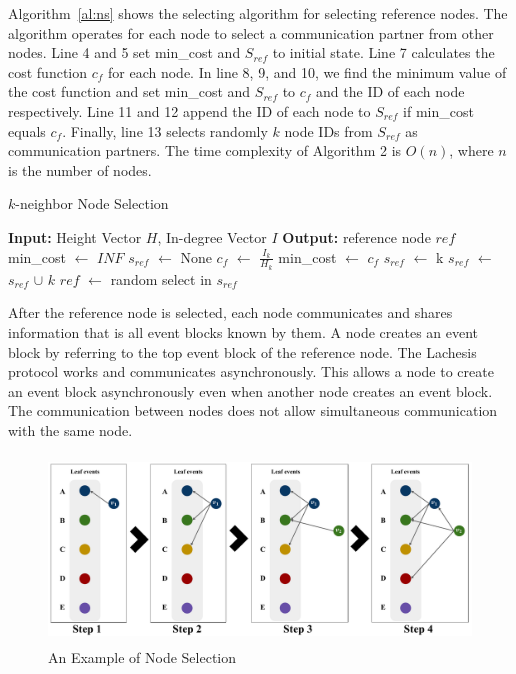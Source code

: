 \documentclass[preprint,12pt]{elsarticle}
\begin{document}
Algorithm~\ref{al:ns} shows the selecting algorithm for selecting reference nodes. The algorithm operates for each node to select a communication partner from other nodes. Line 4 and 5 set min\_cost and $S_{ref}$ to initial state. Line 7 calculates the cost function $c_f$ for each node. In line 8, 9, and 10, we find the minimum value of the cost function and set min\_cost and $S_{ref}$ to $c_f$ and the ID of each node respectively. Line 11 and 12 append the ID of each node to $S_{ref}$ if min\_cost equals $c_f$. Finally, line 13 selects randomly $k$ node IDs from $S_{ref}$ as communication partners. The time complexity of Algorithm 2 is $O(n)$, where $n$ is the number of nodes. 

\begin{algorithm}
	\caption{$k$-neighbor Node Selection}\label{al:ns}
	\begin{algorithmic}[1]
		\State \textbf{Input:} Height Vector $H$, In-degree Vector $I$
		\State \textbf{Output:} reference node $ref$
		\State min\_cost $\leftarrow$ $INF$ 
		\State $s_{ref}$ $\leftarrow$ None
		\State $c_f$ $\leftarrow$ $\frac{I_k}{H_k}$ 
		\State min\_cost $\leftarrow$ $c_f$
		\State $s_{ref}$ $\leftarrow$ {k}
		\State $s_{ref}$ $\leftarrow$ $s_{ref}$ $\cup$ $k$
		\EndIf
		\EndFor
		\State $ref$ $\leftarrow$ random select in $s_{ref}$
		\EndProcedure
	\end{algorithmic}
\end{algorithm}

After the reference node is selected, each node communicates and shares information that is all event blocks known by them. A node creates an event block by referring to the top event block of the reference node. The Lachesis protocol works and communicates asynchronously. This allows a node to create an event block asynchronously even when another node creates an event block. The communication between nodes does not allow simultaneous communication with the same node. 

\begin{figure} \centering  
	\includegraphics[height=5cm]{fig_nsEx.pdf}
	\caption{An Example of Node Selection}
	\label{fig:nsEx}
\end{figure}
\end{document}
